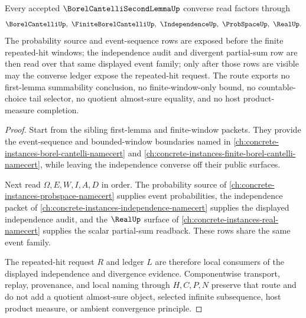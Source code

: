 \begin{theorem}
\label{thm:borel-cantelli-second-lemma-independence-route}
Every accepted $\BorelCantelliSecondLemmaUp$ converse read factors through
$$
\BorelCantelliUp,\ \FiniteBorelCantelliUp,\ \IndependenceUp,\ \ProbSpaceUp,\ \RealUp .
$$
The probability source and event-sequence rows are exposed before the finite repeated-hit windows; the independence audit and divergent partial-sum row are then read over that same displayed event family; only after those rows are visible may the converse ledger expose the repeated-hit request. The route exports no first-lemma summability conclusion, no finite-window-only bound, no countable-choice tail selector, no quotient almost-sure equality, and no host product-measure completion.
\end{theorem}
\begin{proof}
Start from the sibling first-lemma and finite-window packets. They provide the event-sequence and bounded-window boundaries named in \autoref{ch:concrete-instances-borel-cantelli-namecert} and \autoref{ch:concrete-instances-finite-borel-cantelli-namecert}, while leaving the independence converse off their public surfaces.

Next read $\Omega,E,W,I,A,D$ in order. The probability source of \autoref{ch:concrete-instances-probspace-namecert} supplies event probabilities, the independence packet of \autoref{ch:concrete-instances-independence-namecert} supplies the displayed independence audit, and the $\RealUp$ surface of \autoref{ch:concrete-instances-real-namecert} supplies the scalar partial-sum readback. These rows share the same event family.

The repeated-hit request $R$ and ledger $L$ are therefore local consumers of the displayed independence and divergence evidence. Componentwise transport, replay, provenance, and local naming through $H,C,P,N$ preserve that route and do not add a quotient almost-sure object, selected infinite subsequence, host product measure, or ambient convergence principle.
\end{proof}


